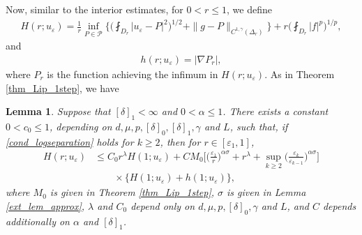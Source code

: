 \documentclass[reqno,12pt]{amsart} %
\newtheorem{lemma}[theorem]{Lemma}
\theoremstyle{definition}
\theoremstyle{remark}
\numberwithin{equation}{section}
\begin{document}
Now, similar to the interior estimates,  for $0<r\leq 1$, 
we define
\begin{align*}
  H(r; u_\varepsilon)=\frac{1}{r}\inf_{P\in \mathcal{P}}\bigg\{\bigg(\fint_{D_r}|u_\varepsilon-P|^2\bigg)^{1/2}+\|g-P\|_{C^{1, \gamma}(\Delta_r)}\bigg\}+r\bigg(\fint_{D_r}|f|^p\bigg)^{1/p},
\end{align*}
and
\begin{align*}
  h(r; u_\varepsilon)=|\nabla P_r|,
\end{align*}
where $P_r$ is the function achieving the infimum in $H(r; u_\varepsilon)$. As in Theorem \ref{thm_Lip_1step}, we have
\begin{lemma}\label{ext_lem_firststep}
  Suppose that $[\delta]_1<\infty$ and $0<\alpha\leq 1$. There exists a constant $0< c_0\leq 1$, depending on $d, \mu, p, [\delta]_0, [\delta]_1, \gamma $ and $L$, such that, if \eqref{cond_logseparation} holds for $k\geq 2$, then for $r\in[\varepsilon_1, 1]$,
  \begin{align*}
    H(r; u_\varepsilon)&\leq C_0 r^\lambda H(1; u_\varepsilon)+CM_0\bigg[\Big(\frac{\varepsilon_1}{r}\Big)^{\alpha\sigma}+r^\lambda+\sup_{k\geq 2}\bigg(\frac{\varepsilon_k}{\varepsilon_{k-1}}\bigg)^{\alpha\sigma}\bigg]\\&\qquad\times\{H(1; u_\varepsilon)+h(1; u_\varepsilon)\},
  \end{align*}
  where $M_0$ is given in Theorem \ref{thm_Lip_1step}, $\sigma$ is given in Lemma \ref{ext_lem_approx}, $\lambda$ and $C_0$ depend only on $d, \mu, p, [\delta]_0, \gamma$ and $L$, and $C$ depends additionally on $\alpha$ and $[\delta]_1$.
\end{lemma}
\end{document}
